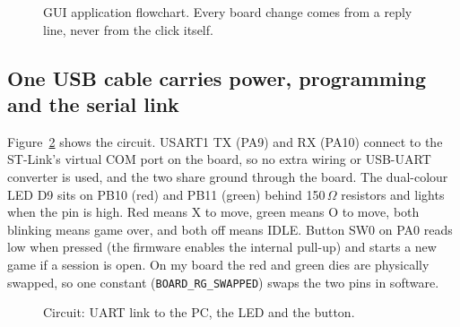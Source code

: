 \begin{figure}[t]
\centering

\caption{GUI application flowchart. Every board change comes from a reply
line, never from the click itself.}
\label{fig:gui}
\end{figure}

\subsection{One USB cable carries power, programming and the serial link}
Figure~\ref{fig:circuit} shows the circuit. USART1 TX (PA9) and RX (PA10)
connect to the ST-Link's virtual COM port on the board, so no extra wiring or
USB-UART converter is used, and the two share ground through the board. The
dual-colour LED D9 sits on PB10 (red) and PB11 (green) behind 150\,$\Omega$
resistors and lights when the pin is high. Red means X to move, green means O
to move, both blinking means game over, and both off means IDLE. Button SW0 on
PA0 reads low when pressed (the firmware enables the internal pull-up) and
starts a new game if a session is open. On my board the red and green dies
are physically swapped, so one constant (\texttt{BOARD\_RG\_SWAPPED}) swaps the
two pins in software.

\begin{figure}[t]
\centering

\caption{Circuit: UART link to the PC, the LED and the button.}
\label{fig:circuit}
\end{figure}
